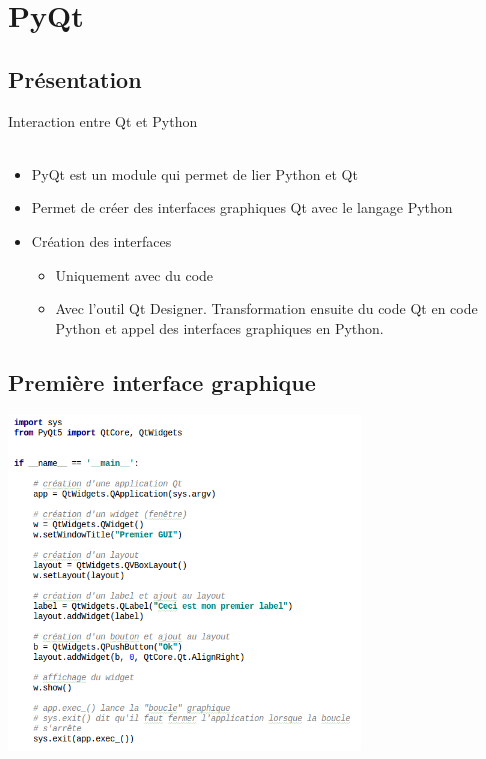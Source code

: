 \documentclass[9pt, french, brown]{beamer}
\newcommand{\mytitle}[1]{{\color{brown}#1 \\~\\}}
\begin{document}
\section{PyQt} 

\subsection{Présentation} 
\begin{frame}{\secname}{\subsecname}
\mytitle{Interaction entre Qt et Python}
\begin{itemize}
\item PyQt est un module qui permet de lier Python et Qt
\item Permet de créer des interfaces graphiques Qt avec le langage Python
\item Création des interfaces
	\begin{itemize}
	\item Uniquement avec du code
	\item Avec l\rq{}outil Qt Designer. Transformation ensuite du code Qt en code Python et appel des interfaces graphiques en Python.
	\end{itemize}
\end{itemize}
\end{frame}

\subsection{Première interface graphique} 
\begin{frame}[fragile]{\secname}{\subsecname}
\begin{center}\includegraphics[width=0.7\textwidth]{img/widget0_1}\end{center}
\end{frame}
\end{document}
